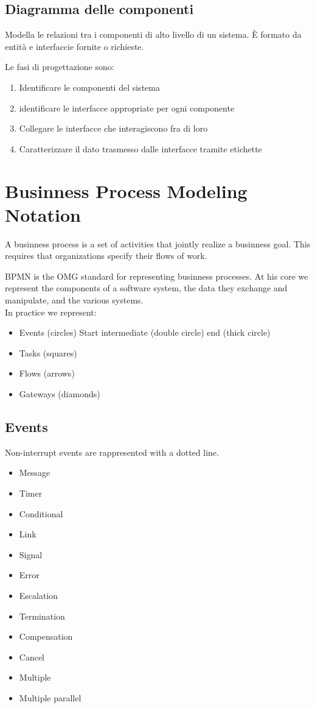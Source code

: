 \documentclass[12pt, a4paper]{article}
\begin{document}
\subsection{Diagramma delle componenti}
Modella le relazioni tra i componenti di alto livello di un sistema. È formato da entità e interfaccie fornite
o richieste.

Le fasi di progettazione sono: 
\begin{enumerate}
    \item Identificare le componenti del sistema
    \item identificare le interfacce appropriate per ogni componente
    \item Collegare le interfacce che interagiscono fra di loro
    \item Caratterizzare il dato trasmesso dalle interfacce tramite etichette
\end{enumerate}

\newpage
\section{Businness Process Modeling Notation}
A businness process is a set of activities that jointly realize a businness goal. This requires that organizations 
specify their flows of work.

BPMN is the OMG standard for representing businness processes. At his core we represent the components of a 
software system, the data they exchange and manipulate, and the various systems.\\ In practice we represent:
\begin{itemize}
    \item Events (circles)
    \subitem Start
    \subitem intermediate (double circle)
    \subitem end (thick circle)
    \item Tasks (squares)
    \item Flows (arrows)
    \item Gateways (diamonds)
\end{itemize}


\subsection{Events}
Non-interrupt events are rappresented with a dotted line.
\begin{itemize}
    \item Message 
    \item Timer 
    \item Conditional 
    \item Link 
    \item Signal 
    \item Error 
    \item Escalation 
    \item Termination 
    \item Compensation 
    \item Cancel 
    \item Multiple 
    \item Multiple parallel 
\end{itemize}
\end{document}
